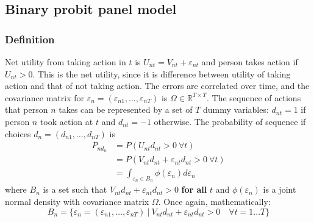 \documentclass[11pt,a4paper]{article}
\begin{document}
\subsection*{Binary probit panel model}
\subsubsection*{Definition}
Net utility from taking action in $ t $ is
$ U_{nt} = V_{nt} + \varepsilon_{nt} $ and person takes action
if $ U_{nt}> 0 $. This is the net utility, since it is difference
between utility of taking action and that of not taking action.
The errors are correlated over time, and the covariance matrix
for $ \varepsilon_{n} = (\varepsilon_{n1}, \dots, \varepsilon_{nT}) $
is $ \Omega\in\mathbb{R}^{T\times T} $. The sequence of actions
that person $ n $ takes can be represented by a set of $ T $ dummy
variables: $ d_{nt} = 1 $ if person $ n $ took action at $ t $ and
$ d_{nt} = -1 $ otherwise. The probability of sequence if choices
$ d_n = (d_{n1}, \dots, d_{nT}) $ is
\begin{align*}
    P_{nd_n} & = P(U_{nt}d_{nt}>0~ \forall t)                                   \\
             & = P(V_{nt}d_{nt} + \varepsilon_{nt}d_{nt} > 0 ~\forall t)        \\
             & = \int_{\varepsilon_n \in B_n} \phi(\varepsilon_n)d\varepsilon_n
\end{align*}
where $ B_n $ is a set such that $ V_{nt}d_{nt} + \varepsilon_{nt}d_{nt} > 0 $
\textbf{for all} $ t $ and $ \phi(\varepsilon_n)  $ is a joint
normal density with covariance matrix $ \Omega $. Once again,
mathematically:
$$ B_n = \{ \varepsilon_n = (\varepsilon_{n1}, \dots, \varepsilon_{nT}) ~|~V_{nt}d_{nt} + \varepsilon_{nt}d_{nt} > 0 \quad \forall t = 1...T\} $$
\end{document}
